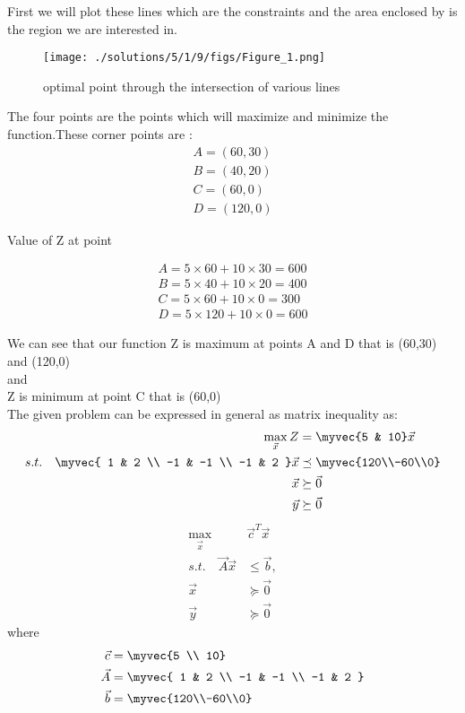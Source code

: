 First we will plot these lines which are the constraints and the area enclosed by is the region we are interested in.

\begin{figure}[h]
\texttt{[image: ./solutions/5/1/9/figs/Figure\_1.png]}
\caption{optimal point through the intersection of various lines}
\label{eq:solutions/5/1/9/fig:Figure_1}
\end{figure}

The four points are the points which will maximize and minimize the function.These corner points are :
\begin{align*}
    A=(60,30)
\\
    B=(40,20)
\\
    C=(60,0)
\\
    D=(120,0)
\end{align*}

Value of Z at point

\begin{align*}
     A= 5\times 60 + 10 \times 30 =600
\\
     B= 5\times 40 + 10 \times 20 =400
\\
     C= 5\times 60 + 10 \times 0 =300
\\
     D= 5\times 120 + 10 \times 0 =600
\end{align*}

We can see that our function Z is maximum at points A and D that is (60,30) and (120,0)\\
and\\
Z is minimum at point C that is (60,0)\\
The given problem can be expressed in general as matrix inequality as:
\begin{align}
\max_{\vec{x}} Z &= \myvec{5 & 10}\vec{x}
\\
s.t. \quad 
\myvec{
1 & 2
\\
-1 & -1
\\
-1 & 2
}
\vec{x} &\preceq \myvec{120\\-60\\0}
\\
\vec{x} &\succeq \vec{0}\\
\vec{y} &\succeq \vec{0}
\end{align}
\begin{align}
\max_{\vec{x}} &\vec{c}^{T}\vec{x}
\\
s.t. \quad \vec{A}\vec{x} &\le \vec{b},
\\
\vec{x} &\succeq\vec{0}\\
\vec{y} &\succeq \vec{0}
\end{align}
%
where
\begin{align}
\vec{c} &= \myvec{5 \\ 10}
\\
\vec{A} &=
\myvec{
1 & 2
\\
-1 & -1
\\
-1 & 2
}
\\
\vec{b}&=\myvec{120\\-60\\0}
%
\end{align}
%
%
